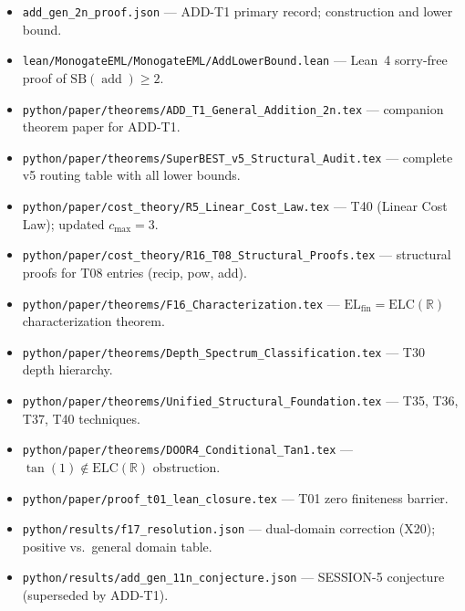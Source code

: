 \documentclass[12pt,a4paper]{article}
\theoremstyle{definition}
\newcommand{\addop}{\operatorname{add}}
\newcommand{\SB}{\mathrm{SB}}
\newcommand{\ELC}{\mathrm{ELC}(\mathbb{R})}
\newcommand{\ELfin}{\mathrm{EL}_{\mathrm{fin}}}
\begin{document}
\begin{itemize}
\item \texttt{add\_gen\_2n\_proof.json} ---
  ADD-T1 primary record; construction and lower bound.
\item \texttt{lean/MonogateEML/MonogateEML/AddLowerBound.lean} ---
  Lean~4 sorry-free proof of $\SB(\addop)\geq 2$.
\item \texttt{python/paper/theorems/ADD\_T1\_General\_Addition\_2n.tex} ---
  companion theorem paper for ADD-T1.
\item \texttt{python/paper/theorems/SuperBEST\_v5\_Structural\_Audit.tex} ---
  complete v5 routing table with all lower bounds.
\item \texttt{python/paper/cost\_theory/R5\_Linear\_Cost\_Law.tex} ---
  T40 (Linear Cost Law); updated $c_{\max}=3$.
\item \texttt{python/paper/cost\_theory/R16\_T08\_Structural\_Proofs.tex} ---
  structural proofs for T08 entries (recip, pow, add).
\item \texttt{python/paper/theorems/F16\_Characterization.tex} ---
  $\ELfin = \ELC$ characterization theorem.
\item \texttt{python/paper/theorems/Depth\_Spectrum\_Classification.tex} ---
  T30 depth hierarchy.
\item \texttt{python/paper/theorems/Unified\_Structural\_Foundation.tex} ---
  T35, T36, T37, T40 techniques.
\item \texttt{python/paper/theorems/DOOR4\_Conditional\_Tan1.tex} ---
  $\tan(1)\notin\ELC$ obstruction.
\item \texttt{python/paper/proof\_t01\_lean\_closure.tex} ---
  T01 zero finiteness barrier.
\item \texttt{python/results/f17\_resolution.json} ---
  dual-domain correction (X20); positive vs.\ general domain table.
\item \texttt{python/results/add\_gen\_11n\_conjecture.json} ---
  SESSION-5 conjecture (superseded by ADD-T1).
\end{itemize}
\end{document}
